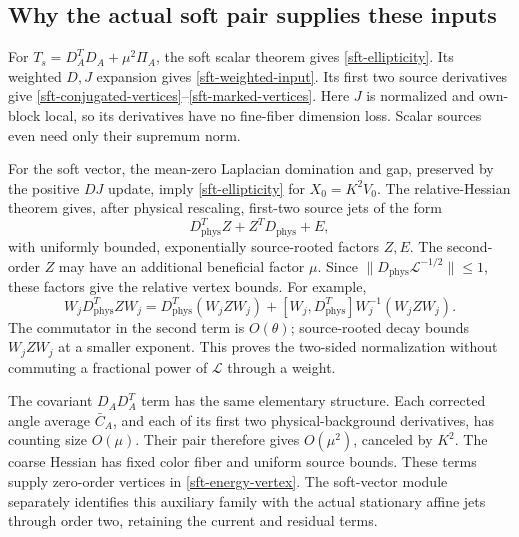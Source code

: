 \documentclass[11pt]{article}
\theoremstyle{remark}
\begin{document}
\subsection{Why the actual soft pair supplies these inputs}
\label{sft-application-inputs}

For \(T_s=D_A^TD_A+\mu^2\Pi_A\), the soft scalar theorem gives
\eqref{sft-ellipticity}. Its weighted \(D,J\) expansion gives
\eqref{sft-weighted-input}. Its first two source derivatives give
\eqref{sft-conjugated-vertices}--\eqref{sft-marked-vertices}.
Here \(J\) is normalized and own-block local, so its derivatives
have no fine-fiber dimension loss. Scalar sources even need only
their supremum norm.

For the soft vector, the mean-zero Laplacian domination and gap,
preserved by the positive \(DJ\) update, imply
\eqref{sft-ellipticity} for \(X_0=K^2V_0\).
The relative-Hessian theorem gives, after physical rescaling,
first-two source jets of the form
\begin{equation}
 D_{\mathrm{phys}}^TZ+Z^TD_{\mathrm{phys}}+E,
 \label{sft-energy-vertex}
\end{equation}
with uniformly bounded, exponentially source-rooted factors \(Z,E\).
The second-order \(Z\) may have an additional beneficial factor
\(\mu\). Since
\(\|D_{\mathrm{phys}}\mathcal L^{-1/2}\|\le1\),
these factors give the relative vertex bounds. For example,
\[
 W_jD_{\mathrm{phys}}^TZW_j
 =D_{\mathrm{phys}}^T(W_jZW_j)
   +[W_j,D_{\mathrm{phys}}^T]W_j^{-1}(W_jZW_j).
\]
The commutator in the second term is \(O(\theta)\); source-rooted
decay bounds \(W_jZW_j\) at a smaller exponent. This proves the
two-sided normalization without commuting a fractional power of
\(\mathcal L\) through a weight.

The covariant \(D_AD_A^T\) term has the same elementary structure.
Each corrected angle average \(\bar C_A\), and each of its first
two physical-background derivatives, has counting size \(O(\mu)\).
Their pair therefore gives \(O(\mu^2)\), canceled by \(K^2\).
The coarse Hessian has fixed color fiber and uniform source bounds.
These terms supply zero-order vertices in
\eqref{sft-energy-vertex}. The soft-vector module separately
identifies this auxiliary family with the actual stationary affine
jets through order two, retaining the current and residual terms.
\end{document}

